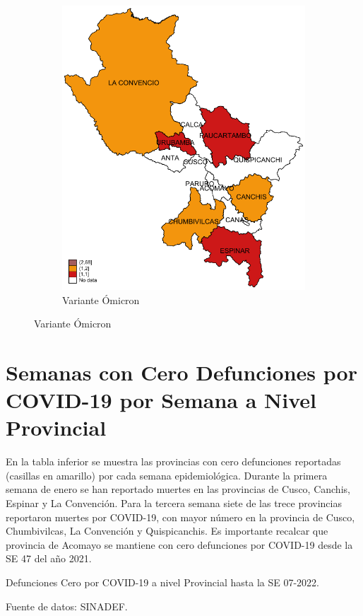 \documentclass[12pt,a4paper,openany]{book}
\begin{document}
\begin{figure}[h]
\begin{subfigure}[b]{0.40\textwidth}
				\includegraphics[width=\textwidth]{../figuras/variantes_provincial_omicron.pdf}
				\caption{Variante Ómicron}
			\end{subfigure}
			\end{figure}

\clearpage


\clearpage
	\section*{Semanas con Cero Defunciones por COVID-19 por Semana a Nivel Provincial}
	
\noindent En la tabla inferior se muestra las provincias con cero defunciones reportadas (casillas en amarillo) por cada semana epidemiológica. Durante la primera semana de enero se han reportado muertes en las provincias de Cusco, Canchis, Espinar y La Convención. Para la tercera semana siete de las trece provincias reportaron muertes por COVID-19, con mayor número en la provincia de Cusco, Chumbivilcas, La Convención y Quispicanchis. Es importante recalcar que provincia de Acomayo se mantiene con cero defunciones por COVID-19 desde la SE 47 del año 2021.
	\begin{table}[h]		\caption{Defunciones Cero por COVID-19 a nivel Provincial hasta la SE 07-2022.}
		\resizebox{\textwidth}{!}{%
			
		}
		{\footnotesize {Fuente de datos: SINADEF.}}
	\end{table}
\pagebreak
\end{document}
